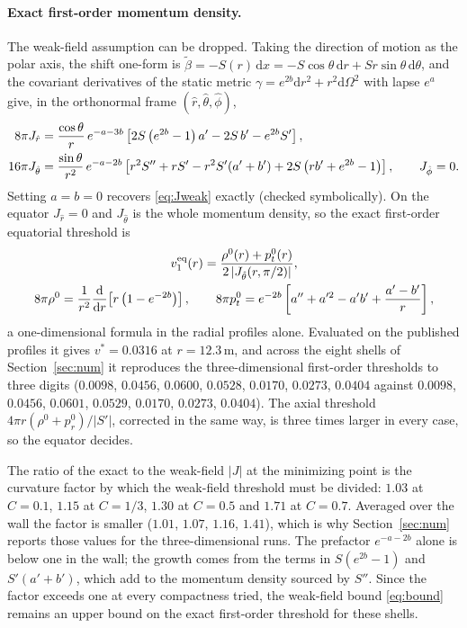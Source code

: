 \documentclass[11pt,a4paper]{article}
\theoremstyle{remark}
\newcommand{\dd}{\mathrm{d}}
\newcommand{\bs}{\tilde\beta}
\begin{document}
\paragraph{Exact first-order momentum density.} The weak-field assumption can be dropped. Taking the direction of motion as the polar axis, the shift one-form is $\bs = -S(r)\,\dd x = -S\cos\theta\,\dd r + Sr\sin\theta\,\dd\theta$, and the covariant derivatives of the static metric $\gamma = e^{2b}\dd r^2 + r^2\dd\Omega^2$ with lapse $e^{a}$ give, in the orthonormal frame $(\hat r, \hat\theta, \hat\phi)$,
\begin{align}
8\pi J_{\hat r} &= \frac{\cos\theta}{r}\, e^{-a-3b}\left[2S\left(e^{2b}-1\right)a' - 2S\,b' - e^{2b}S'\right], \notag\\
16\pi J_{\hat\theta} &= \frac{\sin\theta}{r^2}\, e^{-a-2b}\left[r^2 S'' + r S' - r^2 S'(a'+b') + 2S\left(r b' + e^{2b} - 1\right)\right], \qquad J_{\hat\phi} = 0 .
\label{eq:Jexact}
\end{align}
Setting $a = b = 0$ recovers \eqref{eq:Jweak} exactly (checked symbolically). On the equator $J_{\hat r} = 0$ and $J_{\hat\theta}$ is the whole momentum density, so the exact first-order equatorial threshold is
\begin{gather}
v_1^{\rm eq}(r) = \frac{\rho^0(r) + p_t^0(r)}{2\,|J_{\hat\theta}(r,\pi/2)|}, \notag\\
8\pi\rho^0 = \frac{1}{r^2}\frac{\dd}{\dd r}\!\left[r\left(1-e^{-2b}\right)\right], \qquad
8\pi p_t^0 = e^{-2b}\left[a'' + a'^2 - a'b' + \frac{a'-b'}{r}\right],
\label{eq:veq_exact}
\end{gather}
a one-dimensional formula in the radial profiles alone. Evaluated on the published profiles it gives $v^* = 0.0316$ at $r = 12.3\,\mathrm{m}$, and across the eight shells of Section~\ref{sec:num} it reproduces the three-dimensional first-order thresholds to three digits ($0.0098$, $0.0456$, $0.0600$, $0.0528$, $0.0170$, $0.0273$, $0.0404$ against $0.0098$, $0.0456$, $0.0601$, $0.0529$, $0.0170$, $0.0273$, $0.0404$). The axial threshold $4\pi r(\rho^0 + p_r^0)/|S'|$, corrected in the same way, is three times larger in every case, so the equator decides.

The ratio of the exact to the weak-field $|J|$ at the minimizing point is the curvature factor by which the weak-field threshold must be divided: $1.03$ at $C = 0.1$, $1.15$ at $C = 1/3$, $1.30$ at $C = 0.5$ and $1.71$ at $C = 0.7$. Averaged over the wall the factor is smaller ($1.01$, $1.07$, $1.16$, $1.41$), which is why Section~\ref{sec:num} reports those values for the three-dimensional runs. The prefactor $e^{-a-2b}$ alone is below one in the wall; the growth comes from the terms in $S(e^{2b}-1)$ and $S'(a'+b')$, which add to the momentum density sourced by $S''$. Since the factor exceeds one at every compactness tried, the weak-field bound \eqref{eq:bound} remains an upper bound on the exact first-order threshold for these shells.
\end{document}
